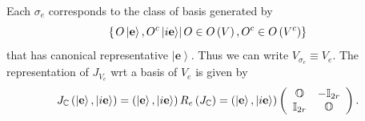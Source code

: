 \documentclass[aps,preprint]{revtex4}
\begin{document}
Each $\sigma_{e}$ corresponds to the class of basis generated by 
\begin{equation}
\left\{ \left. O\left\vert \mathbf{e}\right\rangle ,O^{c}\left\vert i\mathbf{%
e}\right\rangle \right\vert O\in O\left( V\right) ,O^{c}\in O\left(
V^{c}\right) \right\}
\end{equation}
that has canonical representative $\left\vert \mathbf{e}\right\rangle .$
Thus we can write $V_{\sigma_{e}}\equiv V_{e}.$ The representation of $%
J_{V_{e}}$ wrt a basis of $V_{e}$ is given by%
\begin{equation}
J_{\mathbb{C}}\left( \left\vert \mathbf{e}\right\rangle ,\left\vert i\mathbf{%
e}\right\rangle \right) =\left( \left\vert \mathbf{e}\right\rangle
,\left\vert i\mathbf{e}\right\rangle \right) R_{e}\left( J_{\mathbb{C}%
}\right) =\left( \left\vert \mathbf{e}\right\rangle ,\left\vert i\mathbf{e}%
\right\rangle \right) \left( 
\begin{array}{cc}
\mathbb{O} & -\mathbb{I}_{2r} \\ 
\mathbb{I}_{2r} & \mathbb{O}%
\end{array}
\right) .
\end{equation}
\end{document}

